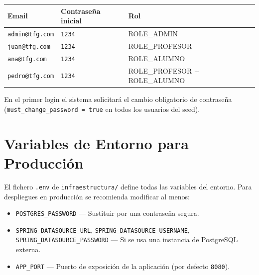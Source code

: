 \documentclass[12pt, a4paper]{report}
\begin{document}
\begin{center}
  \begin{tabular}{lll}
    \toprule
    \textbf{Email} & \textbf{Contraseña inicial} & \textbf{Rol} \\
    \midrule
    \texttt{admin@tfg.com}  & \texttt{1234} & ROLE\_ADMIN \\
    \texttt{juan@tfg.com}   & \texttt{1234} & ROLE\_PROFESOR \\
    \texttt{ana@tfg.com}    & \texttt{1234} & ROLE\_ALUMNO \\
    \texttt{pedro@tfg.com}  & \texttt{1234} & ROLE\_PROFESOR + ROLE\_ALUMNO \\
    \bottomrule
  \end{tabular}
\end{center}

En el primer login el sistema solicitará el cambio obligatorio de contraseña
(\texttt{must\_change\_password = true} en todos los usuarios del seed).

\section{Variables de Entorno para Producción}

El fichero \texttt{.env} de \texttt{infraestructura/} define todas las variables
del entorno. Para despliegues en producción se recomienda modificar al menos:

\begin{itemize}
  \item \texttt{POSTGRES\_PASSWORD} — Sustituir por una contraseña segura.
  \item \texttt{SPRING\_DATASOURCE\_URL}, \texttt{SPRING\_DATASOURCE\_USERNAME},
        \texttt{SPRING\_DATASOURCE\_PASSWORD} — Si se usa una instancia de
        PostgreSQL externa.
  \item \texttt{APP\_PORT} — Puerto de exposición de la aplicación
        (por defecto \texttt{8080}).
\end{itemize}


\clearpage
{}
\end{document}
